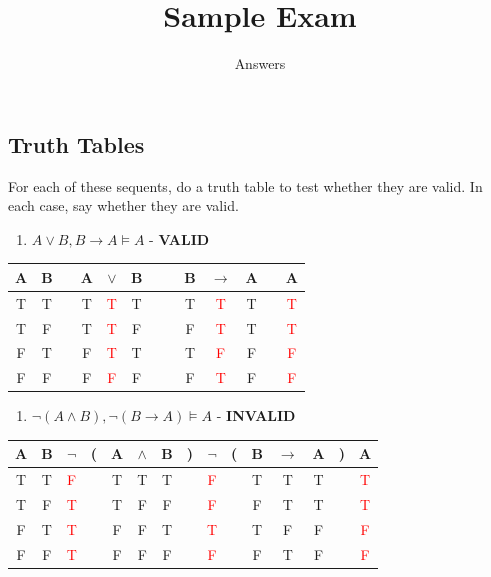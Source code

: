 \documentclass[
  11pt,
]{article}
\title{Sample Exam}
\author{Answers}
\date{}
\providecommand{\tightlist}{%
  \setlength{\itemsep}{0pt}\setlength{\parskip}{0pt}}
\begin{document}
\maketitle

\hypertarget{truth-tables}{%
\subsection{Truth Tables}\label{truth-tables}}

For each of these sequents, do a truth table to test whether they are
valid. In each case, say whether they are valid.

\begin{enumerate}
\def\labelenumi{\arabic{enumi}.}
\tightlist
\item
  \(A \vee B, B \rightarrow A \vDash A\) - \textbf{VALID}
\end{enumerate}

\begin{tabular}{@{ }c@{ }@{ }c | c@{ }@{ }c@{ }@{ }c@{ }@{ }c@{ }@{ }c | c@{ }@{ }c@{ }@{ }c@{ }@{ }c@{ }@{ }c | c}
A & B &  & A & $\lor$ & B &  &  & B & $\rightarrow$ & A &  & A\\
\hline 
T & T &  & T & \textcolor{red}{T} & T &  &  & T & \textcolor{red}{T} & T &  & \textcolor{red}{T}\\
T & F &  & T & \textcolor{red}{T} & F &  &  & F & \textcolor{red}{T} & T &  & \textcolor{red}{T}\\
F & T &  & F & \textcolor{red}{T} & T &  &  & T & \textcolor{red}{F} & F &  & \textcolor{red}{F}\\
F & F &  & F & \textcolor{red}{F} & F &  &  & F & \textcolor{red}{T} & F &  & \textcolor{red}{F}\\
\end{tabular}

\begin{enumerate}
\def\labelenumi{\arabic{enumi}.}
\setcounter{enumi}{1}
\tightlist
\item
  \(\neg (A \wedge B), \neg (B \rightarrow A) \vDash A\) -
  \textbf{INVALID}
\end{enumerate}

\begin{tabular}{@{ }c@{ }@{ }c | c@{ }@{}c@{}@{ }c@{ }@{ }c@{ }@{ }c@{ }@{}c@{ } | c@{ }@{}c@{}@{ }c@{ }@{ }c@{ }@{ }c@{ }@{}c@{ } | c}
A & B & $\lnot$ & ( & A & $\land$ & B & ) & $\lnot$ & ( & B & $\rightarrow$ & A & ) & A\\
\hline 
T & T & \textcolor{red}{F} &  & T & T & T &  & \textcolor{red}{F} &  & T & T & T &  & \textcolor{red}{T}\\
T & F & \textcolor{red}{T} &  & T & F & F &  & \textcolor{red}{F} &  & F & T & T &  & \textcolor{red}{T}\\
F & T & \textcolor{red}{T} &  & F & F & T &  & \textcolor{red}{T} &  & T & F & F &  & \textcolor{red}{F}\\
F & F & \textcolor{red}{T} &  & F & F & F &  & \textcolor{red}{F} &  & F & T & F &  & \textcolor{red}{F}\\
\end{tabular}
\end{document}

